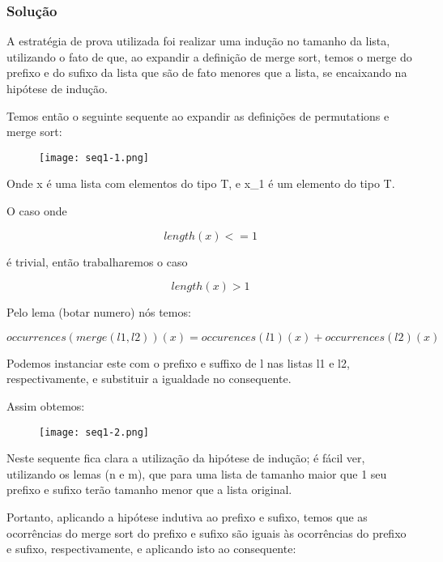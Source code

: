 \documentclass[12pt]{article}
\begin{document}
\subsubsection{Solução}

A estratégia de prova utilizada foi realizar uma indução no tamanho da lista, utilizando o fato de que, ao expandir a definição de merge sort,
temos o merge do prefixo e do sufixo da lista que são de fato menores que a lista, se encaixando na hipótese de indução.

Temos então o seguinte sequente ao expandir as definições de permutations e merge sort:

\begin{figure}[H]
    \centering
    \texttt{[image: seq1-1.png]}
    \caption{}
    \label{}
\end{figure}

Onde x é uma lista com elementos do tipo T, e x\_1 é um elemento do tipo T.

O caso onde 

\begin{equation}
    length(x) <= 1
\end{equation}

é trivial, então trabalharemos o caso 

\begin{equation}
    length(x) > 1
\end{equation}

Pelo lema (botar numero) nós temos:

\begin{equation}
    occurrences(merge(l1, l2))(x) = occurences(l1)(x) + occurrences(l2)(x)
\end{equation}{}

Podemos instanciar este com o prefixo e suffixo de l nas listas l1 e l2, respectivamente, e substituir a igualdade no consequente.

Assim obtemos:

\begin{figure}[H]
    \centering
    \texttt{[image: seq1-2.png]}
    \caption{}
    \label{}
\end{figure}

Neste sequente fica clara a utilização da hipótese de indução; é fácil
ver, utilizando os lemas (n e m), que para uma lista de tamanho maior que 1 seu prefixo e sufixo terão tamanho menor que a lista original.

Portanto, aplicando a hipótese indutiva ao prefixo e sufixo, temos que as ocorrências do merge sort do prefixo e sufixo são iguais às ocorrências do prefixo e sufixo, respectivamente, e aplicando isto ao consequente:
\end{document}

